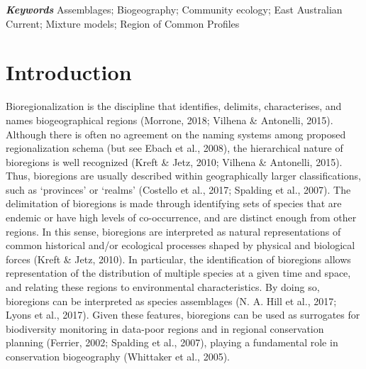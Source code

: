 \documentclass{article}
\begin{document}
\begin{linenumbers}
\textbf{\emph{Keywords}} Assemblages; Biogeography; Community ecology; East Australian Current; Mixture models; Region of Common Profiles

\newpage

\hypertarget{introduction}{%
\section{Introduction}\label{introduction}}

Bioregionalization is the discipline that identifies, delimits, characterises, and names biogeographical regions (Morrone, 2018; Vilhena \& Antonelli, 2015). Although there is often no agreement on the naming systems among proposed regionalization schema (but see Ebach et al., 2008), the hierarchical nature of bioregions is well recognized (Kreft \& Jetz, 2010; Vilhena \& Antonelli, 2015). Thus, bioregions are usually described within geographically larger classifications, such as `provinces' or `realms' (Costello et al., 2017; Spalding et al., 2007). The delimitation of bioregions is made through identifying sets of species that are endemic or have high levels of co-occurrence, and are distinct enough from other regions. In this sense, bioregions are interpreted as natural representations of common historical and/or ecological processes shaped by physical and biological forces (Kreft \& Jetz, 2010). In particular, the identification of bioregions allows representation of the distribution of multiple species at a given time and space, and relating these regions to environmental characteristics. By doing so, bioregions can be interpreted as species assemblages (N. A. Hill et al., 2017; Lyons et al., 2017). Given these features, bioregions can be used as surrogates for biodiversity monitoring in data-poor regions and in regional conservation planning (Ferrier, 2002; Spalding et al., 2007), playing a fundamental role in conservation biogeography (Whittaker et al., 2005).


\end{linenumbers}
\end{document}
